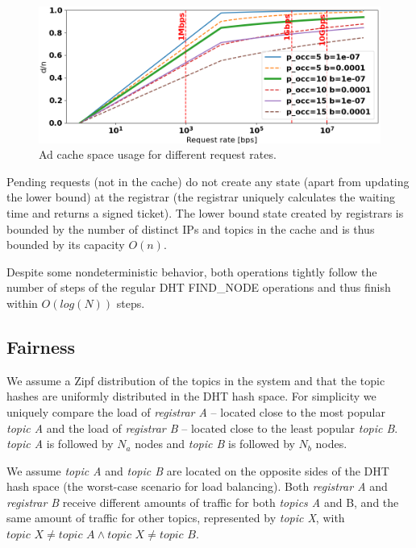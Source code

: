 \begin{figure}[t]
    \includegraphics[width=1\linewidth]{img/cache_size_limit}
    \vspace{-0.10in}
    \caption{Ad cache space usage for different request rates.
    }
    \label{fig:cache_size_limit}
    \vspace{-0.15in}
\end{figure}
Pending requests (\ie not in the cache) do not create any state (apart from updating the lower bound) at the registrar (\ie the registrar uniquely calculates the waiting time and returns a signed ticket). The lower bound state created by registrars is bounded by the number of distinct IPs and topics in the cache and is thus bounded by its capacity $O(n)$.

Despite some nondeterministic behavior, both operations tightly follow the number of steps of the regular DHT FIND\_NODE operations and thus finish within $O(log(N))$ steps.

\subsection{Fairness}
We assume a Zipf distribution of the topics  in the system and that the topic hashes are uniformly distributed in the DHT hash space. For simplicity we uniquely compare the load of \emph{registrar A} -- located close to the most popular \emph{topic A} and the load of \emph{registrar B} -- located close to the least popular \emph{topic B}. \emph{topic A} is followed by $N_a$ nodes and \emph{topic B} is followed by $N_b$ nodes. 

We assume \emph{topic A} and \emph{topic B} are located on the opposite sides of the DHT hash space (the worst-case scenario for load balancing). Both \emph{registrar A} and \emph{registrar B} receive different amounts of traffic for both \emph{topics A} and {B}, and the same amount of traffic for other topics, represented by \emph{topic X}, with $\textit{topic X} \neq \textit{topic A} \wedge \textit{topic X} \neq \textit{topic B}$. 

